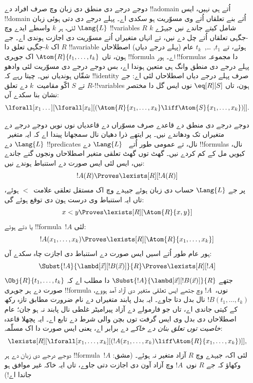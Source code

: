 \documentclass[../../../include/open-logic-section]{subfiles}
\begin{document}


دوجے درجے دی منطق دی زبان وچ صرف افراد دے
!!a{domain} اُتے ہی نہیں، ایس !!{domain} اُتے
بنے تعلقاں اُتے وی مسوّریت ہو سکدی اے۔ پہلے درجے
دی دتی ہوئی زبان $\Lang{L}$ لئی، ہر $k$ واسطے
ایدے وچ !!{variable}s $R$ شامل کیتے جاندے نیں
جیہڑے $k$-جگہی تعلقاں اُتے چل دے نیں، تے انہاں
متغیراں اُتے مسوّریت دی اجازت ہوندی اے۔ جے $R$
اک $k$-جگہی تعلق دا !!a{variable} ہوئے، تے
$t_1$, \dots,~$t_k$ عام (پہلے درجے دیاں)
اصطلاحاں ہون، تاں
$\Atom{R}{t_1,\dots,t_k}$ اک جوہری !!{formula}
اے۔ ہور !!{formula}s دا مجموعہ پہلے درجے دی
منطق وانگ ہی متعین ہوندا اے، بس دوجے درجے دی
مسوّریت لئی وادھو شقّاں ہوندیاں نیں۔ چیتا رہے
کہ !!{identity} صرف پہلے درجے دیاں اصطلاحاں
لئی اے: جے $R$ تے $S$ اکّو مقامیت~$k$ دے
تعلق-!!{variable}s ہون، تاں
$\eq[R][S]$ نوں ایس گل دا مختصر نشان بنا
سکدے آں:
\[
\lforall[x_1 \dots][\lforall[x_k][(\Atom{R}{x_1, \dots, x_k} \liff
  \Atom{S}{x_1, \dots, x_k})]].
\]

دوجے درجے دی منطق دے قاعدے صرف مسوّراں دے
قاعدیاں نوں نویں دوجے درجے دے متغیراں تک
ودھاندے نیں۔ پر ایتھے ذرا دھیان نال سمجھانا
پیندا اے کہ ایہ متغیر~$\Lang{L}$ دے
!!{predicate}s نال، تے عمومی طور اُتے
~$\Lang{L}$ دے !!{formula}s نال، کیویں
مل کے کم کردے نیں۔ گھٹ توں گھٹ تعلقی متغیر
اصطلاحاں ونجوں گنے جاندے نیں، ایس لئی
ایس صورت دے استنباط ہوندے نیں:
\[
!A(R) \Proves \lexists[R][!A(R)]
\]
پر جے $\Lang{L}$ حساب دی زبان ہوئے جیہدے وچ
اک مستقل تعلقی علامت~$<$ ہوئے، تاں ایہ
استنباط وی درست ہون دی توقع ہوئے گی:
\[
x < y \Proves \lexists[R][\Atom{R}{x,y}]
\]
یا دتے ہوئے !!{formula}~$!A$ لئی:
\[
!A(x_1, \dots, x_k) \Proves \lexists[R][\Atom{R}{x_1,\dots,x_k}]
\]
ہور عام طور اُتے اسیں ایس صورت دے استنباط
دی اجازت چاہ سکدے آں:
\[
\Subst{!A}{\lambd[\vec x][!B(\vec x)]}{R} \Proves
\lexists[R][!A]
\]
جتھے $\Subst{!A}{\lambd[\vec x][!B(\vec x)]}{R}$
دا مطلب اے کہ
$\Obj{R}{t_1,\dots,t_k}$ صورت دے ہر جوہری
!!{formula} نوں،~$!A$ وچ جتھے ایس تعلقی متغیر دی آزاد آمد ہووے،
$!B(t_1, \dots, t_k)$ نال بدل
دتا جاوے۔
ایہ بدل پابند متغیراں دے نام ضرورت مطابق تازہ رکھ کے
کیتی جاندی اے، تاں جو فارمولے دے آزاد پیرامیٹر غلطی
نال پابند نہ ہو جان؛ عام اصطلاحاں دی بدل وی ایس
گرفت توں بچن والی شرط دے تابع اے۔ ایہ پچھلا قاعدہ {\em خاصیت توں
تعلق بنان دے خاکے} دے برابر اے، یعنی ایس صورت
دا اک مسلّمہ:
\[
\lexists[R][\lforall[x_1, \dots, x_k][(!A(x_1, \dots, x_k) \liff
\Atom{R}{x_1, \dots, x_k})]],
\]
دوجے درجے دی زبان دے ہر !!{formula}~$!A$
لئی اک، جیہدے وچ $R$ آزاد متغیر نہ ہوئے۔
(مشق: وکھاؤ کہ جے $R$ نوں~$!A$ وچ آزاد آون دی
اجازت دتی جاوے، تاں ایہ خاکہ غیر موافق
ہو جاندا اے!)
\end{document}
